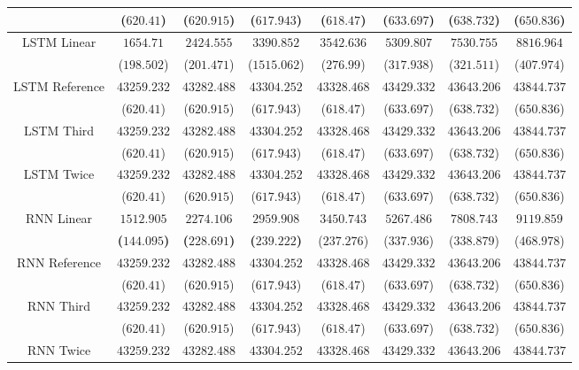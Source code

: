 \begin{table}[!ht]
{\begin{tabular}{|c|c|c|c|c|c|c|c|}
			 & ($620.41$) & ($620.915$) & ($617.943$) & ($618.47$) & ($633.697$) & ($638.732$) & ($650.836$) \\ \hline
			\multirow{2}{*}{LSTM Linear} & $1654.71$ & $2424.555$ & $3390.852$ & $3542.636$ & $5309.807$ & $7530.755$ & $8816.964$ \\
			 & ($198.502$) & ($201.471$) & ($1515.062$) & ($276.99$) & ($317.938$) & ($321.511$) & ($407.974$) \\ \hline
			\multirow{2}{*}{LSTM Reference} & $43259.232$ & $43282.488$ & $43304.252$ & $43328.468$ & $43429.332$ & $43643.206$ & $43844.737$ \\
			 & ($620.41$) & ($620.915$) & ($617.943$) & ($618.47$) & ($633.697$) & ($638.732$) & ($650.836$) \\ \hline
			\multirow{2}{*}{LSTM Third} & $43259.232$ & $43282.488$ & $43304.252$ & $43328.468$ & $43429.332$ & $43643.206$ & $43844.737$ \\
			 & ($620.41$) & ($620.915$) & ($617.943$) & ($618.47$) & ($633.697$) & ($638.732$) & ($650.836$) \\ \hline
			\multirow{2}{*}{LSTM Twice} & $43259.232$ & $43282.488$ & $43304.252$ & $43328.468$ & $43429.332$ & $43643.206$ & $43844.737$ \\
			 & ($620.41$) & ($620.915$) & ($617.943$) & ($618.47$) & ($633.697$) & ($638.732$) & ($650.836$) \\ \hline
			\multirow{2}{*}{RNN Linear} & $\mathbf{1512.905}$ & $\mathbf{2274.106}$ & $\mathbf{2959.908}$ & $3450.743$ & $5267.486$ & $7808.743$ & $9119.859$ \\
			 & \textbf{(}$\mathbf{144.095}$\textbf{)} & \textbf{(}$\mathbf{228.691}$\textbf{)} & \textbf{(}$\mathbf{239.222}$\textbf{)} & ($237.276$) & ($337.936$) & ($338.879$) & ($468.978$) \\ \hline
			\multirow{2}{*}{RNN Reference} & $43259.232$ & $43282.488$ & $43304.252$ & $43328.468$ & $43429.332$ & $43643.206$ & $43844.737$ \\
			 & ($620.41$) & ($620.915$) & ($617.943$) & ($618.47$) & ($633.697$) & ($638.732$) & ($650.836$) \\ \hline
			\multirow{2}{*}{RNN Third} & $43259.232$ & $43282.488$ & $43304.252$ & $43328.468$ & $43429.332$ & $43643.206$ & $43844.737$ \\
			 & ($620.41$) & ($620.915$) & ($617.943$) & ($618.47$) & ($633.697$) & ($638.732$) & ($650.836$) \\ \hline
			\multirow{2}{*}{RNN Twice} & $43259.232$ & $43282.488$ & $43304.252$ & $43328.468$ & $43429.332$ & $43643.206$ & $43844.737$ \\

\end{tabular}}
\end{table}
